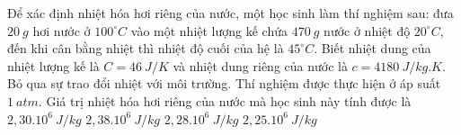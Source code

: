 \begin{vidu} 
	Để xác định nhiệt hóa hơi riêng của nước, một học sinh làm thí nghiệm sau: đưa $20 \ g$ hơi nước ở $100^\circ C$ vào một nhiệt lượng kế chứa $470 \ g$ nước ở nhiệt độ $20^\circ C$, đến khi cân bằng nhiệt thì nhiệt độ cuối của hệ là $45^\circ C$. Biết nhiệt dung của nhiệt lượng kế là $C=46 \ J /K$ và nhiệt dung riêng của nước là $c=4180 \ J/kg. K$. Bỏ qua sự trao đổi nhiệt với môi trường. Thí nghiệm được thực hiện ở  áp suất $1\ atm$. Giá trị nhiệt hóa hơi riêng của nước mà học sinh này tính được là 
	\choice
	{$2,30.10^{6} \ J/kg$}
	{$2,38.10^{6} \ J/kg$}
	{\True $2,28.10^{6} \ J/kg$}
	{$2,25.10^{6} \ J/kg$}
\end{vidu}
